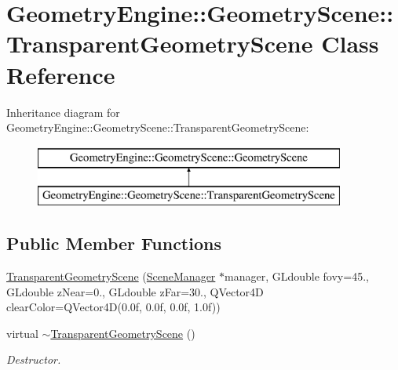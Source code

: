\hypertarget{class_geometry_engine_1_1_geometry_scene_1_1_transparent_geometry_scene}{}\section{Geometry\+Engine\+::Geometry\+Scene\+::Transparent\+Geometry\+Scene Class Reference}
\label{class_geometry_engine_1_1_geometry_scene_1_1_transparent_geometry_scene}
Inheritance diagram for Geometry\+Engine\+::Geometry\+Scene\+::Transparent\+Geometry\+Scene\+:\begin{figure}[H]
\begin{center}
\leavevmode
\includegraphics[height=2.000000cm]{class_geometry_engine_1_1_geometry_scene_1_1_transparent_geometry_scene}
\end{center}
\end{figure}
\subsection*{Public Member Functions}
\begin{DoxyCompactItemize}
\item 
\mbox{\hyperlink{class_geometry_engine_1_1_geometry_scene_1_1_transparent_geometry_scene_a873055f8fbe37ce34db8e12b0c51d74d}{Transparent\+Geometry\+Scene}} (\mbox{\hyperlink{class_geometry_engine_1_1_scene_manager}{Scene\+Manager}} $\ast$manager, G\+Ldouble fovy=45., G\+Ldouble z\+Near=0., G\+Ldouble z\+Far=30., Q\+Vector4D clear\+Color=Q\+Vector4D(0.\+0f, 0.\+0f, 0.\+0f, 1.\+0f))
\item 
\mbox{\label{class_geometry_engine_1_1_geometry_scene_1_1_transparent_geometry_scene_ac61ab01ae8891549670fe0c23c51fb05}} 
virtual \mbox{\hyperlink{class_geometry_engine_1_1_geometry_scene_1_1_transparent_geometry_scene_ac61ab01ae8891549670fe0c23c51fb05}{$\sim$\+Transparent\+Geometry\+Scene}} ()
\begin{DoxyCompactList}\small\item\em Destructor. \end{DoxyCompactList}\end{DoxyCompactItemize}
